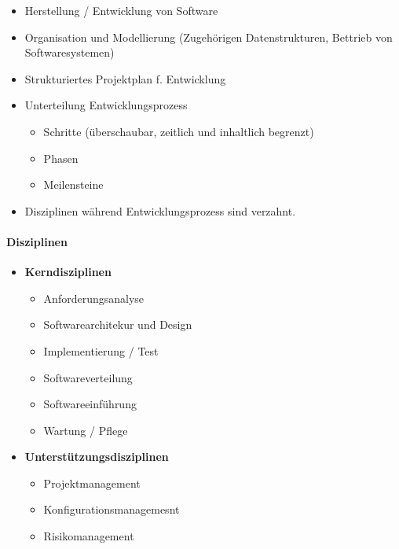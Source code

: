 \documentclass[../ZF_SWEN1.tex]{subfiles}
\begin{document}
\begin{itemize}
    \item Herstellung / Entwicklung von Software
    \item Organisation und Modellierung (Zugehörigen Datenstrukturen, Bettrieb von Softwaresystemen)
    \item Strukturiertes Projektplan f. Entwicklung
    \item Unterteilung Entwicklungsprozess
    \begin{itemize}
        \item Schritte (überschaubar, zeitlich und inhaltlich begrenzt)
        \item Phasen
        \item Meilensteine
    \end{itemize}
    \item Disziplinen während Entwicklungsprozess sind verzahnt.
    
\end{itemize}

\paragraph{Disziplinen}
\begin{itemize}
    \item \textbf{Kerndisziplinen}
    \begin{itemize}
        \item Anforderungsanalyse
        \item Softwarearchitekur und Design
        \item Implementierung / Test
        \item Softwareverteilung
        \item Softwareeinführung
        \item Wartung / Pflege
    \end{itemize}
    \item \textbf{Unterstützungsdisziplinen}
    \begin{itemize}
        \item Projektmanagement
        \item Konfigurationsmanagemesnt
        \item Risikomanagement
    \end{itemize}
\end{itemize}
\end{document}
